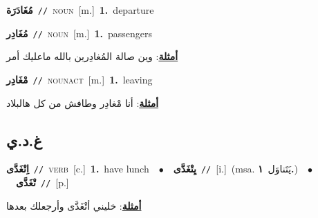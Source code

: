 \documentclass[10pt,a4paper,twoside]{article} %
\begin{document}
\begin{multicols}{2}
{{{{{\setlength\topsep{0pt}\textbf{\foreignlanguage{arabic}{مُغَادَرَة}}\ {\color{gray}\texttt{//}\color{black}}\ \textsc{noun}\ [m.]\ \textbf{1.}~departure\ 

{\setlength\topsep{0pt}\textbf{\foreignlanguage{arabic}{مُغَادِر}}\ {\color{gray}\texttt{//}\color{black}}\ \textsc{noun}\ [m.]\ \textbf{1.}~passengers\  \begin{flushright}\color{gray}\foreignlanguage{arabic}{\textbf{\underline{\foreignlanguage{arabic}{أمثلة}}}: وين صالة المُغادِرين بالله ماعليك أمر}\end{flushright}\color{black}} \vspace{2mm}

{\setlength\topsep{0pt}\textbf{\foreignlanguage{arabic}{مْغَادِر}}\ {\color{gray}\texttt{//}\color{black}}\ \textsc{noun\textunderscore act}\ [m.]\ \textbf{1.}~leaving\  \begin{flushright}\color{gray}\foreignlanguage{arabic}{\textbf{\underline{\foreignlanguage{arabic}{أمثلة}}}: أنا مْغادِر وطافش من كل هالبلاد}\end{flushright}\color{black}} \vspace{2mm}

\vspace{-3mm}
\subsection*{\color{blue}\foreignlanguage{arabic}{غ.د.ي}\color{blue}{}} 

{\setlength\topsep{0pt}\textbf{\foreignlanguage{arabic}{اِتْغَدَّى}}\ {\color{gray}\texttt{//}\color{black}}\ \textsc{verb}\ [c.]\ \textbf{1.}~have lunch\ \ $\bullet$\ \ \setlength\topsep{0pt}\textbf{\foreignlanguage{arabic}{يِتْغَدَّى}}\ {\color{gray}\texttt{//}\color{black}}\ [i.]\ \color{gray}(msa. \foreignlanguage{arabic}{يَتَناوَل}~\foreignlanguage{arabic}{\textbf{١.}})\color{black}\ \ $\bullet$\ \ \setlength\topsep{0pt}\textbf{\foreignlanguage{arabic}{تْغَدَّى}}\ {\color{gray}\texttt{//}\color{black}}\ [p.]\  \begin{flushright}\color{gray}\foreignlanguage{arabic}{\textbf{\underline{\foreignlanguage{arabic}{أمثلة}}}: خليني أتْغَدَّى وأرجعلك بعدها}\end{flushright}\color{black}} \vspace{2mm}

}}}}}
\end{multicols}
\end{document}
